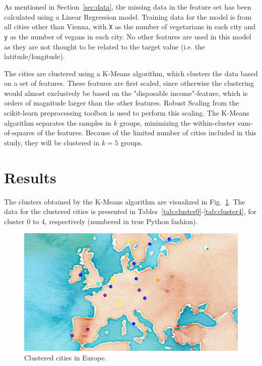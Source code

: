 \documentclass[12pt,a4paper]{article}
\begin{document}
As mentioned in Section~\ref{sec:data}, the missing data in the feature set has been calculated using a Linear Regression model. Training data for the model is from all cities other than Vienna, with \texttt{X} as the number of vegetarians in each city and \texttt{y} as the number of vegans in each city. No other features are used in this model as they are not thought to be related to the target value (i.e. the latitude/longitude). 

The cities are clustered using a K-Means algorithm, which clusters the data based on a set of features. These features are first scaled, since otherwise the clustering would almost exclusively be based on the "disposable income"-feature, which is orders of magnitude larger than the other features. Robust Scaling from the scikit-learn preprocessing toolbox is used to perform this scaling. The K-Means algorithm separates the samples in $k$ groups, minimizing the within-cluster sum-of-squares of the features. Because of the limited number of cities included in this study, they will be clustered in $ k = 5$ groups. 

\section{Results}
\label{sec:results}
The clusters obtained by the K-Means algorithm are visualized in Fig.~\ref{fig:clusteredCities}. The data for the clustered cities is presented in Tables~\ref{tab:cluster0}-\ref{tab:cluster4}, for cluster 0 to 4, respectively (numbered in true Python fashion). 
\begin{figure}
	\includegraphics[width=\linewidth]{clusteredCities}
	\caption{Clustered cities in Europe. }
	\label{fig:clusteredCities}
\end{figure}
\end{document}
